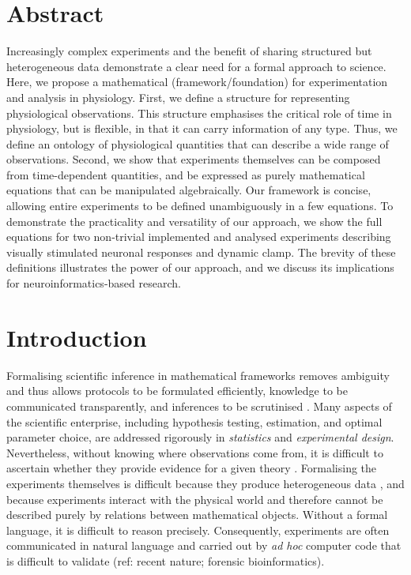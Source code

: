 
\section*{Abstract}

Increasingly complex experiments and the benefit of sharing structured
but heterogeneous data demonstrate a clear need for a formal approach
to science.  Here, we propose a mathematical (framework/foundation) for
experimentation and analysis in physiology. First, we define a
structure for representing physiological observations. This structure
emphasises the critical role of time in physiology, but is flexible,
in that it can carry information of any type. Thus, we define an
ontology of physiological quantities that can describe a wide range of
observations. Second, we show that experiments themselves can be
composed from time-dependent quantities, and be expressed as purely
mathematical equations that can be manipulated algebraically. Our
framework is concise, allowing entire experiments to be defined
unambiguously in a few equations. To demonstrate the practicality and
versatility of our approach, we show the full equations for two
non-trivial implemented and analysed experiments describing visually
stimulated neuronal responses and dynamic clamp. The brevity of these
definitions illustrates the power of our approach, and we discuss its
implications for neuroinformatics-based research.

\pagebreak

\section*{Introduction}

Formalising scientific inference in mathematical frameworks removes
ambiguity and thus allows protocols to be formulated efficiently,
knowledge to be communicated transparently, and inferences to be
scrutinised \citep{Soldatova2006, Jaynes2003, Krantz1971}. Many
aspects of the scientific enterprise, including hypothesis testing,
estimation, and optimal parameter choice, are addressed rigorously in
\emph{statistics} and \emph{experimental design}. Nevertheless,
without knowing where observations come from, it is difficult to
ascertain whether they provide evidence for a given theory
\citep{Pool2002,MacKenzie-Graham2008,VanHorn2009}. Formalising the
experiments themselves is difficult because they produce heterogeneous
data \citep{Tukey1962}, and because experiments interact with the
physical world and therefore cannot be described purely by relations
between mathematical objects. Without a formal language, it is
difficult to reason precisely. Consequently, experiments are often
communicated in natural language and carried out by \emph{ad hoc}
computer code that is difficult to validate (ref: recent nature;
forensic bioinformatics). 

